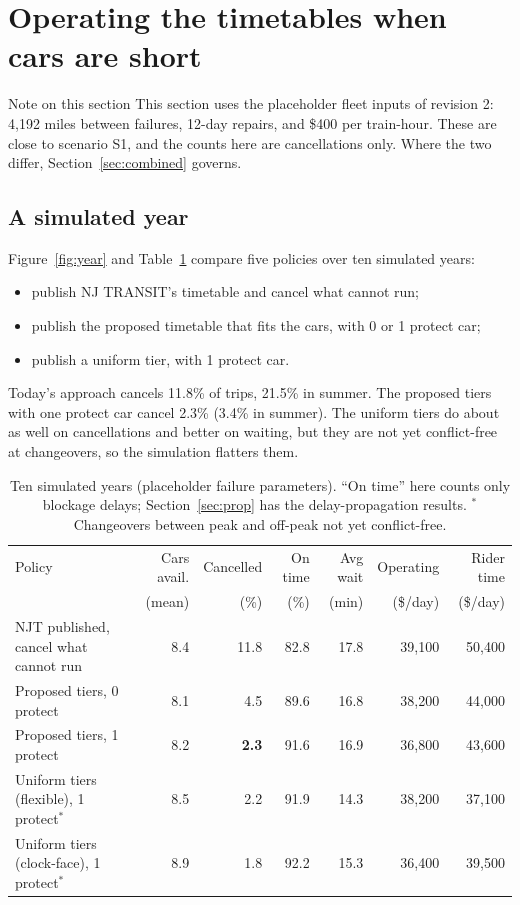 \documentclass[11pt]{article}
\begin{document}
\section{Operating the timetables when cars are short}\label{sec:results}
\begin{keybox}{Note on this section}
This section uses the placeholder fleet inputs of revision 2: 4{,}192 miles between failures, 12-day repairs, and \$400 per train-hour. These are close to scenario S1, and the counts here are cancellations only. Where the two differ, Section~\ref{sec:combined} governs.
\end{keybox}
\subsection{A simulated year}
Figure~\ref{fig:year} and Table~\ref{tab:annual} compare five policies over ten simulated years:
\begin{itemize}
\item publish NJ TRANSIT's timetable and cancel what cannot run;
\item publish the proposed timetable that fits the cars, with 0 or 1 protect car;
\item publish a uniform tier, with 1 protect car.
\end{itemize}
Today's approach cancels 11.8\% of trips, 21.5\% in summer. The proposed tiers with one protect car cancel 2.3\% (3.4\% in summer). The uniform tiers do about as well on cancellations and better on waiting, but they are not yet conflict-free at changeovers, so the simulation flatters them.

\begin{table}[ht]\centering\small
\begin{tabular}{@{}lrrrrrr@{}}
\toprule
Policy & Cars avail. & Cancelled & On time & Avg wait & Operating & Rider time \\
 & (mean) & (\%) & (\%) & (min) & (\$/day) & (\$/day) \\
\midrule
NJT published, cancel what cannot run & 8.4 & 11.8 & 82.8 & 17.8 & 39{,}100 & 50{,}400 \\
Proposed tiers, 0 protect & 8.1 & 4.5 & 89.6 & 16.8 & 38{,}200 & 44{,}000 \\
Proposed tiers, 1 protect & 8.2 & \textbf{2.3} & 91.6 & 16.9 & 36{,}800 & 43{,}600 \\
Uniform tiers (flexible), 1 protect$^\ast$ & 8.5 & 2.2 & 91.9 & 14.3 & 38{,}200 & 37{,}100 \\
Uniform tiers (clock-face), 1 protect$^\ast$ & 8.9 & 1.8 & 92.2 & 15.3 & 36{,}400 & 39{,}500 \\
\bottomrule
\end{tabular}
\caption{Ten simulated years (placeholder failure parameters). ``On time'' here counts only blockage delays; Section~\ref{sec:prop} has the delay-propagation results. $^\ast$Changeovers between peak and off-peak not yet conflict-free.}\label{tab:annual}
\end{table}
\end{document}
